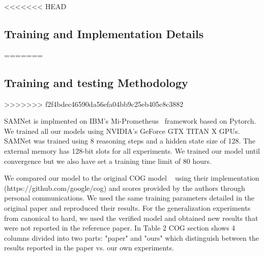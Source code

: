 \begin{table}[!t]
	\centering
	\caption{COG Dataset parameters for the canonical setting and the hard setting  }

	
	\label{tab:parameters}
\end{table}


<<<<<<< HEAD
\subsection{Training and Implementation Details}
=======

\subsection{Training and testing Methodology}
>>>>>>> f2f4bdec46590da56efa04bb9c25eb405c8c3882

SAMNet is implmented on IBM's Mi-Prometheus~\cite{kornuta2018accelerating} framework based on Pytorch. 
We trained all our models using NVIDIA’s GeForce GTX TITAN X GPUs. SAMNet was trained using 8 reasoning steps and a hidden state size of 128. The external memory has 128-bit slots for all experiments. We trained our model until convergence but we also have set a training time limit of 80 hours.

We compared our model to the original COG model  ~\cite{yang2018dataset} using their implementation (https://github.com/google/cog) and scores provided by the authors through personal communications. We used the same training parameters detailed in the original paper and reproduced their results.  For the generalization experiments from canonical to hard, we used the verified model and obtained new results that were not reported in the reference paper.   In Table 2 COG section shows 4 columns divided into two parts: "paper" and "ours" which distinguish between the results reported in the paper vs. our own experiments.

